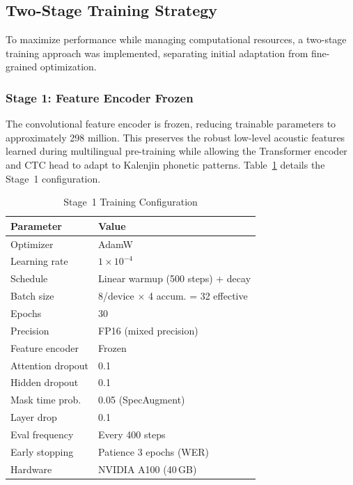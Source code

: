 \documentclass[conference]{IEEEtran}
\begin{document}
\subsection{Two-Stage Training Strategy}

To maximize performance while managing computational resources, a two-stage training approach was implemented, separating initial adaptation from fine-grained optimization.

\subsubsection{Stage 1: Feature Encoder Frozen}
The convolutional feature encoder is frozen, reducing trainable parameters to approximately 298 million. This preserves the robust low-level acoustic features learned during multilingual pre-training while allowing the Transformer encoder and CTC head to adapt to Kalenjin phonetic patterns. Table~\ref{tab:stage1} details the Stage~1 configuration.

\begin{table}[!t]
\caption{Stage~1 Training Configuration}
\label{tab:stage1}
\centering
\small
\begin{tabular}{|l|l|}
\hline
\textbf{Parameter} & \textbf{Value} \\
\hline
\hline
Optimizer & AdamW \\
\hline
Learning rate & $1 \times 10^{-4}$ \\
\hline
Schedule & Linear warmup (500 steps) + decay \\
\hline
Batch size & 8/device $\times$ 4 accum. = 32 effective \\
\hline
Epochs & 30 \\
\hline
Precision & FP16 (mixed precision) \\
\hline
Feature encoder & Frozen \\
\hline
Attention dropout & 0.1 \\
\hline
Hidden dropout & 0.1 \\
\hline
Mask time prob. & 0.05 (SpecAugment) \\
\hline
Layer drop & 0.1 \\
\hline
Eval frequency & Every 400 steps \\
\hline
Early stopping & Patience 3 epochs (WER) \\
\hline
Hardware & NVIDIA A100 (40\,GB) \\
\hline
\end{tabular}
\end{table}
\end{document}
